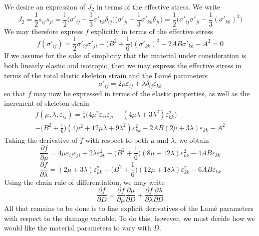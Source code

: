 \documentclass[11pt]{article} %
\begin{document}
We desire an expression of $J_2$ in terms of the effective stress. We write
\begin{equation}
	J_2 = \frac{1}{2} s_{ij} s_{ji} = \frac{1}{2} \bigg( \sigma'_{ij} - \frac{1}{3} \sigma'_{kk} \delta_{ij} \bigg) \bigg( \sigma'_{ji} - \frac{1}{3} \sigma'_{kk} \delta_{ji} \bigg) = \frac{1}{2} \bigg( \sigma'_{ij} \sigma'_{ji} - \frac{1}{3} (\sigma'_{kk})^2 \bigg)
\end{equation}
We may therefore express $f$ explicitly in terms of the effective stress
\begin{equation}
	f(\sigma'_{ij}) = \frac{1}{2} \sigma'_{ij} \sigma'_{ji} - \bigg( B^2 + \frac{1}{6} \bigg)  (\sigma'_{kk})^2 - 2AB\sigma'_{kk} - A^2 = 0
\end{equation}
If we assume for the sake of simplicity that the material under consideration is both linearly elastic and isotropic, then we may express the effective stress in terms of the total elastic skeleton strain and the Lam\'{e} parameters
\begin{equation}
	\sigma'_{ij} = 2 \mu \varepsilon_{ij} + \lambda \delta_{ij} \varepsilon_{kk}
\end{equation}
so that $f$ may now be expressed in terms of the elastic properties, as well as the increment of skeleton strain
\begin{eqnarray}
	f(\mu,\lambda,\varepsilon_{ij}) = \frac{1}{2} \bigg( 4 \mu^2 \varepsilon_{ij} \varepsilon_{ji} + (4 \mu \lambda + 3 \lambda^2) \varepsilon^2_{kk} \bigg) \\ \nonumber
           - \bigg( B^2 + \frac{1}{6} \bigg) (4 \mu^2 + 12 \mu \lambda + 9 \lambda^2) \varepsilon^2_{kk} - 2AB(2 \mu + 3 \lambda) \varepsilon_{kk} - A^2
\end{eqnarray}
Taking the derivative of $f$ with respect to both $\mu$ and $\lambda$, we obtain
\begin{equation}
	\frac{\partial f}{\partial \mu} = 4 \mu \varepsilon_{ij} \varepsilon_{ji} + 2 \lambda \varepsilon^2_{kk} - \bigg( B^2 + \frac{1}{6} \bigg) (8 \mu + 12 \lambda) \varepsilon^2_{kk} - 4AB \varepsilon_{kk}
\end{equation}
\begin{equation}
	\frac{\partial f}{\partial \lambda} = (2 \mu + 3 \lambda) \varepsilon^2_{kk} - \bigg( B^2 + \frac{1}{6} \bigg) (12 \mu + 18 \lambda) \varepsilon^2_{kk} - 6AB \varepsilon_{kk}
\end{equation}
Using the chain rule of differentiation, we may write
\begin{equation}
	\frac{\partial f}{\partial D} = \frac{\partial f}{\partial \mu} \frac{\partial \mu}{\partial D} + \frac{\partial f}{\partial \lambda} \frac{\partial \lambda}{\partial D}
\end{equation}
All that remains to be done is to fine explicit derivatives of the Lam\'{e} parameters with respect to the damage variable. To do this, however, we must decide how we would like the material parameters to vary with $D$.
\end{document}

